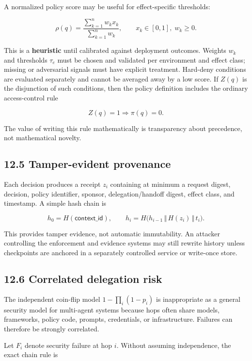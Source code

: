 \documentclass[
  10pt,
  letterpaper,
]{article}
\begin{document}
A normalized policy score may be useful for effect-specific thresholds:

\[
\rho(q)=\frac{\sum_{k=1}^{n} w_k x_k}{\sum_{k=1}^{n} w_k},
\qquad x_k\in[0,1],\; w_k\ge 0.
\]

This is a \textbf{heuristic} until calibrated against deployment
outcomes. Weights \(w_k\) and thresholds \(\tau_e\) must be chosen and
validated per environment and effect class; missing or adversarial
signals must have explicit treatment. Hard-deny conditions are evaluated
separately and cannot be averaged away by a low score. If \(Z(q)\) is
the disjunction of such conditions, then the policy definition includes
the ordinary access-control rule

\[
Z(q)=1 \Rightarrow \pi(q)=0.
\]

The value of writing this rule mathematically is transparency about
precedence, not mathematical novelty.

\subsection{12.5 Tamper-evident
provenance}\label{tamper-evident-provenance}

Each decision produces a receipt \(z_i\) containing at minimum a request
digest, decision, policy identifier, sponsor, delegation/handoff digest,
effect class, and timestamp. A simple hash chain is

\[
h_0 = H(\textsf{context\_id}),\qquad
h_i = H\big(h_{i-1}\,\Vert\,H(z_i)\,\Vert\,t_i\big).
\]

This provides tamper evidence, not automatic immutability. An attacker
controlling the enforcement and evidence systems may still rewrite
history unless checkpoints are anchored in a separately controlled
service or write-once store.

\subsection{12.6 Correlated delegation
risk}\label{correlated-delegation-risk}

The independent coin-flip model \(1-\prod_i(1-p_i)\) is inappropriate as
a general security model for multi-agent systems because hops often
share models, frameworks, policy code, prompts, credentials, or
infrastructure. Failures can therefore be strongly correlated.

Let \(F_i\) denote security failure at hop \(i\). Without assuming
independence, the exact chain rule is
\end{document}
